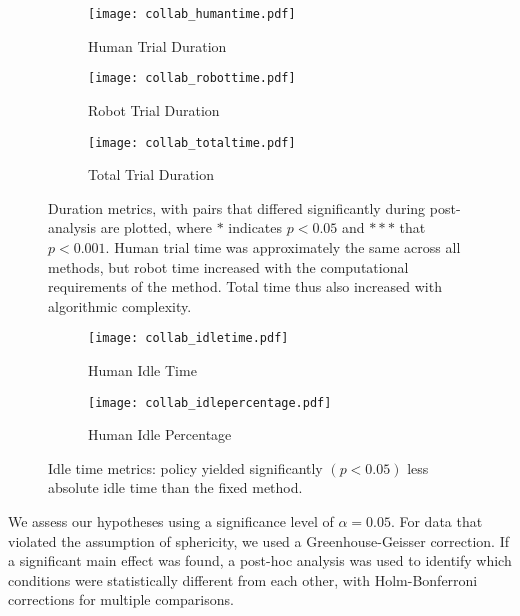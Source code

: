 \begin{figure*}[t]
	\begin{subfigure}[b]{0.32\textwidth}
		\texttt{[image: collab\_humantime.pdf]}
		\caption{Human Trial Duration}
		\label{fig:result_humantime}
	\end{subfigure}
	\hfill
	\begin{subfigure}[b]{0.32\textwidth}
		\texttt{[image: collab\_robottime.pdf]}
		\caption{Robot Trial Duration}
		\label{fig:result_robottime}
	\end{subfigure}
	\hfill
	\begin{subfigure}[b]{0.32\textwidth}
		\texttt{[image: collab\_totaltime.pdf]}
		\caption{Total Trial Duration}
		\label{fig:result_totaltime}
	\end{subfigure}
	\caption{Duration metrics, with pairs that differed significantly during post-analysis are plotted, where ${*}$ indicates $p<0.05$ and ${*}{*}{*}$ that $p<0.001$. Human trial time was approximately the same across all methods, but robot time increased with the computational requirements of the method. Total time thus also increased with algorithmic complexity.}
	\label{fig:duration}
\end{figure*}

\begin{figure}[t]
	\begin{subfigure}[b]{0.49\columnwidth}
		\texttt{[image: collab\_idletime.pdf]}
		\caption{Human Idle Time}
		\label{fig:result_idletime}
	\end{subfigure}
	\hfill
	\begin{subfigure}[b]{0.49\columnwidth}
		\texttt{[image: collab\_idlepercentage.pdf]}
		\caption{Human Idle Percentage}
		\label{fig:result_idlepercentage}
	\end{subfigure}
	\caption{Idle time metrics: policy yielded significantly $(p<0.05)$ less absolute idle time than the fixed method.}
	\label{fig:idle}
\end{figure}

We assess our hypotheses using a significance level of $\alpha=0.05$. For data that violated the assumption of sphericity, we used a Greenhouse-Geisser correction. If a significant main effect was found, a post-hoc analysis was used to identify which conditions were statistically different from each other, with Holm-Bonferroni corrections for multiple comparisons.

